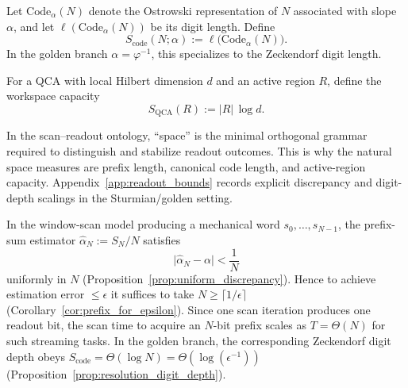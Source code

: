 \begin{definition}
\label{def:coding_space_complexity}
Let $\mathrm{Code}_\alpha(N)$ denote the Ostrowski representation of $N$ associated with slope $\alpha$, and let $\ell(\mathrm{Code}_\alpha(N))$ be its digit length. Define
\begin{equation}
S_{\mathrm{code}}(N;\alpha):=\ell\bigl(\mathrm{Code}_\alpha(N)\bigr).
\end{equation}
In the golden branch $\alpha=\varphi^{-1}$, this specializes to the Zeckendorf digit length.
\end{definition}

\begin{definition}
\label{def:qca_space_complexity}
For a QCA with local Hilbert dimension $d$ and an active region $R$, define the workspace capacity
\begin{equation}
S_{\mathrm{QCA}}(R):=|R|\,\log d.
\end{equation}
\end{definition}

In the scan--readout ontology, ``space'' is the minimal orthogonal grammar required to distinguish and stabilize readout outcomes. This is why the natural space measures are prefix length, canonical code length, and active-region capacity. Appendix~\ref{app:readout_bounds} records explicit discrepancy and digit-depth scalings in the Sturmian/golden setting.

\begin{proposition}
\label{prop:sturmian_TS_scaling}
In the window-scan model producing a mechanical word $s_0,\dots,s_{N-1}$, the prefix-sum estimator $\widehat{\alpha}_N:=S_N/N$ satisfies
\begin{equation}
\bigl|\widehat{\alpha}_N-\alpha\bigr|<\frac{1}{N}
\end{equation}
uniformly in $N$ (Proposition~\ref{prop:uniform_discrepancy}).
Hence to achieve estimation error $\le\epsilon$ it suffices to take $N\ge\lceil 1/\epsilon\rceil$ (Corollary~\ref{cor:prefix_for_epsilon}).
Since one scan iteration produces one readout bit, the scan time to acquire an $N$-bit prefix scales as $T=\Theta(N)$ for such streaming tasks.
In the golden branch, the corresponding Zeckendorf digit depth obeys $S_{\mathrm{code}}=\Theta(\log N)=\Theta(\log(\epsilon^{-1}))$ (Proposition~\ref{prop:resolution_digit_depth}).
\end{proposition}

